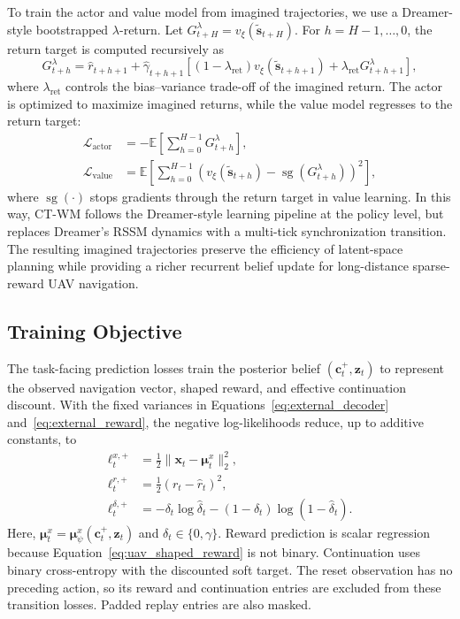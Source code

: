 \documentclass{article}
\begin{document}
To train the actor and value model from imagined trajectories, we use a Dreamer-style bootstrapped $\lambda$-return. Let $G^{\lambda}_{t+H}=v_{\xi}(\tilde{\mathbf s}_{t+H})$. For $h=H-1,\ldots,0$, the return target is computed recursively as
\begin{equation}
G^{\lambda}_{t+h}
=
\hat r_{t+h+1}
+
\hat \gamma_{t+h+1}
\left[
(1-\lambda_{\mathrm{ret}})
v_{\xi}(\tilde{\mathbf s}_{t+h+1})
+
\lambda_{\mathrm{ret}}
G^{\lambda}_{t+h+1}
\right],
\label{eq:lambda_return}
\end{equation}
where $\lambda_{\mathrm{ret}}$ controls the bias--variance trade-off of the imagined return. The actor is optimized to maximize imagined returns, while the value model regresses to the return target:
\begin{align}
\mathcal L_{\mathrm{actor}}
&=
-
\mathbb E\!\left[
\sum_{h=0}^{H-1}
G^{\lambda}_{t+h}
\right],
\label{eq:actor_loss}\\
\mathcal L_{\mathrm{value}}
&=
\mathbb E\!\left[
\sum_{h=0}^{H-1}
\left(
v_{\xi}(\tilde{\mathbf s}_{t+h})
-
\operatorname{sg}(G^{\lambda}_{t+h})
\right)^2
\right],
\label{eq:value_loss}
\end{align}
where $\operatorname{sg}(\cdot)$ stops gradients through the return target in value learning. In this way, CT-WM follows the Dreamer-style learning pipeline at the policy level, but replaces Dreamer's RSSM dynamics with a multi-tick synchronization transition. The resulting imagined trajectories preserve the efficiency of latent-space planning while providing a richer recurrent belief update for long-distance sparse-reward UAV navigation.

\subsection{Training Objective}

The task-facing prediction losses train the posterior belief $(\mathbf c_t^+,\mathbf z_t)$ to represent the observed navigation vector, shaped reward, and effective continuation discount. With the fixed variances in Equations~\eqref{eq:external_decoder} and~\eqref{eq:external_reward}, the negative log-likelihoods reduce, up to additive constants, to
\begin{align}
\ell^{x,+}_{t}&=\tfrac12\|\mathbf x_t-\boldsymbol\mu^{x}_{t}\|_2^2,
\label{eq:nrsm_observation_loss}\\
\ell^{r,+}_{t}&=\tfrac12(r_t-\hat r_t)^2,
\label{eq:nrsm_reward_loss}\\
\ell^{\delta,+}_{t}&=-\delta_t\log\hat\delta_t
-(1-\delta_t)\log(1-\hat\delta_t).
\label{eq:nrsm_done_loss}
\end{align}
Here, $\boldsymbol\mu^{x}_{t}=\boldsymbol\mu_{\psi}^{x}(\mathbf c_t^+,\mathbf z_t)$ and $\delta_t\in\{0,\gamma\}$. Reward prediction is scalar regression because Equation~\eqref{eq:uav_shaped_reward} is not binary. Continuation uses binary cross-entropy with the discounted soft target. The reset observation has no preceding action, so its reward and continuation entries are excluded from these transition losses. Padded replay entries are also masked.
\end{document}

